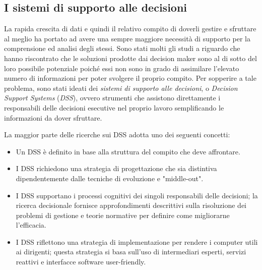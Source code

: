 \subsection{I sistemi di supporto alle decisioni}

La rapida crescita di dati e quindi il relativo compito di doverli gestire e sfruttare al meglio ha portato ad avere una sempre maggiore necessità di supporto per la comprensione ed analisi degli stessi. Sono stati molti gli studi a riguardo che hanno riscontrato che le soluzioni prodotte dai decision maker sono al di sotto del loro possibile potenziale poiché essi non sono in grado di assimilare l'elevato numero di informazioni per poter svolgere il proprio compito. Per sopperire a tale problema, sono stati ideati dei \textit{sistemi di supporto alle decisioni}, o \textit{Decision Support Systems} (\textit{DSS}), ovvero strumenti che assistono direttamente i responsabili delle decisioni esecutive nel proprio lavoro semplificando le informazioni da dover sfruttare.\cite{dss_introduction}

La maggior parte delle ricerche sui DSS adotta uno dei seguenti concetti:\cite{mit_keen_dss}

\begin{itemize}
    \item Un DSS è definito in base alla struttura del compito che deve affrontare.
    \item I DSS richiedono una strategia di progettazione che sia distintiva dipendentemente dalle tecniche di evoluzione e "middle-out".
    \item I DSS supportano i processi cognitivi dei singoli responsabili delle decisioni; la ricerca decisionale fornisce approfondimenti descrittivi sulla risoluzione dei problemi di gestione e teorie normative per definire come migliorarne l'efficacia.
    \item I DSS riflettono una strategia di implementazione per rendere i computer utili ai dirigenti; questa strategia si basa sull'uso di intermediari esperti, servizi reattivi e interfacce software user-friendly.
\end{itemize}

